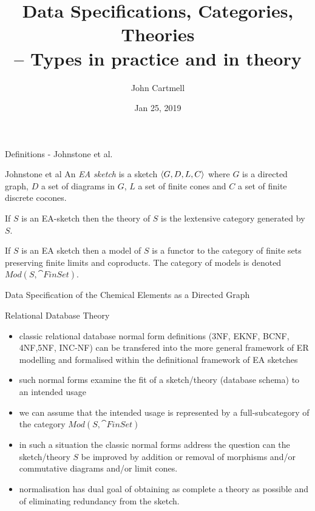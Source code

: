\documentclass[xcolor=pst,dvips, handout]{beamer}   %
\title[Types in practice and in theory]{Data Specifications, Categories, Theories\\ -- Types in practice and in theory}
\author{John Cartmell}
\institute{Ad Otium}
\date{Jan 25, 2019}
\begin{document}
\newcommand{\attr}[1]{#1}
\renewcommand{\attr}[1]{\psframebox[linecolor=red,framearc=.1]{#1}}
\newcommand{\attrtype}[1]{#1}
\renewcommand{\attrtype}[1]{\psframebox[linecolor=blue,framearc=.1]{#1}}
\newcommand{\etype}[1]{#1}
\renewcommand{\etype}[1]{\psframebox[linecolor=red,framearc=.1]{#1}}

\newcommand{\CEsymboltype}[0]{varchar(2)}
\newcommand{\CEatomicnumbertype}{number(1,1000)}
\newcommand{\CEfloattype}{float}
\newcommand{\CEnametype}{varchar(64)}
\newcommand{\CEvalencynumbertype}{number(-7,7)}

\begin{frame}{Definitions - Johnstone et al.}
\begin{definition}{Johnstone et al}
An \textit{EA sketch} is a sketch $\langle G,D,L,C\rangle$ where $G$ is a directed graph, $D$ a set of diagrams in $G$, $L$ a set of finite cones and
$C$ a set of finite discrete cocones.
\end{definition}


If $S$ is an EA-sketch then the theory of $S$ is the lextensive category generated by $S$.

If $S$ is an EA sketch then a model of $S$ is a functor to the category of finite sets preserving finite limits and coproducts.
The category of models is denoted $Mod(S,\cat{FinSet})$.
\end{frame}

\begin{frame}{Data Specification of the Chemical Elements as a Directed Graph}
\scalebox{0.65}{

} 
\end{frame}

\begin{frame}{Relational Database Theory}
\begin{itemize}
\item classic relational database normal form definitions ({\scriptsize 3NF, EKNF, BCNF, 4NF,5NF, INC-NF}) can be transfered into the more general framework
of ER modelling and formalised within the definitional framework of EA sketches

\item such normal forms  examine the fit of a sketch/theory (database schema) to an intended usage

\item we can assume that the intended usage is represented by a full-subcategory of the category $Mod(S,\cat{FinSet})$

\item in such a situation the classic normal forms address the question can the sketch/theory $S$ be improved by addition or removal of morphisms and/or commutative diagrams and/or limit cones.
\item normalisation has dual goal of obtaining as complete a theory as possible and of eliminating redundancy from the sketch.  
\end{itemize}
\end{frame}
\end{document}
